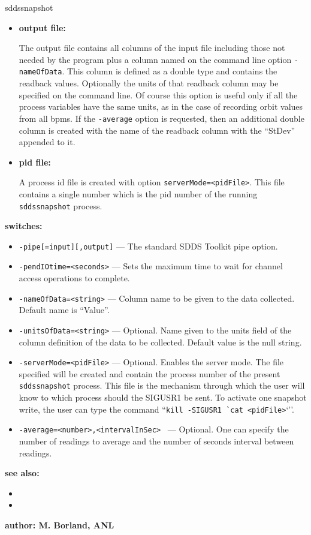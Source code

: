 \begin{sddsprog}{sddssnapshot}
\begin{itemize}
\item {\bf output file:}\par
The output file contains all columns of the input file including those
not needed by the program plus a column named on the command line option {\tt -nameOfData}.
This column is defined as a double type and contains the readback values. 
Optionally the units of that readback column may be specified on the command line.
Of course this option is useful only if all the process variables have the same units, as in
the case of recording orbit values from all bpms.
If the {\tt -average} option is requested, then an additional double column is created with the name
of the readback column with the ``StDev'' appended to it.

\item {\bf pid file:}\par
A process id file is created with option {\verb+serverMode=<pidFile>+}. This file contains a single
number which is the pid number of the running {\verb+sddssnapshot+} process.
\end{itemize}
\item {\bf switches:}
    \begin{itemize}
        \item {\tt -pipe[=input][,output]} --- The standard SDDS Toolkit pipe option.
        \item {\tt -pendIOtime=<seconds>} --- Sets the maximum time to wait for channel access operations to complete.
        \item {\tt -nameOfData=<string>} --- Column name to be given to the data collected. Default name is ``Value''.
        \item {\tt -unitsOfData=<string>} --- Optional. Name given to the units field of the column definition
                        of the data to be collected. Default value is the null string.
        \item {\tt -serverMode=<pidFile>} --- Optional. Enables the server mode. The file specified will be created and contain
                the process number of the present \verb+sddssnapshot+ process. This file is the mechanism
                through which the user will know to which process should the SIGUSR1 be sent.
                To activate one snapshot write, the user can type
                the command ``\verb+kill -SIGUSR1 `cat <pidFile>+`''.
        \item {\tt -average=<number>,<intervalInSec> } --- Optional. One can specify the number of readings to
                average and the number of seconds interval between readings.
    \end{itemize}

\item {\bf see also:}
    \begin{itemize}
    \item {}
    \item {}
    \end{itemize}
\item {\bf author: M. Borland, ANL} 
\end{sddsprog}

